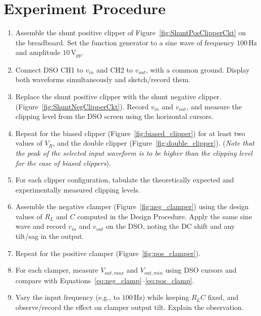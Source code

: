 \section{Experiment Procedure}

\begin{enumerate}[label=\arabic*.]
	\item Assemble the shunt positive clipper of Figure~\ref{fig:ShuntPosClipperCkt} on the breadboard. Set the function generator to a sine wave of frequency $100\,\text{Hz}$ and amplitude $10\,\text{V}_{pp}$. 
	\item Connect DSO CH1 to $v_{in}$ and CH2 to $v_{out}$, with a common ground. Display both waveforms simultaneously and sketch/record them.
	\item Replace the shunt positive clipper with the shunt negative clipper. (Figure~\ref{fig:ShuntNegClipperCkt}). Record $v_{in}$ and $v_{out}$, and measure the clipping level from the DSO screen using the horizontal cursors.
	\item Repeat for the biased clipper (Figure~\ref{fig:biased_clipper}) for at least two values of $V_R$, and the double clipper (Figure~\ref{fig:double_clipper}). (\emph{Note that the peak of the selected input waveform is to be higher than the clipping level for the case of biased clippers}).
	\item For each clipper configuration, tabulate the theoretically expected and experimentally measured clipping levels.
	\item Assemble the negative clamper (Figure~\ref{fig:neg_clamper}) using the design values of $R_L$ and $C$ computed in the Design Procedure. Apply the same sine wave and record $v_{in}$ and $v_{out}$ on the DSO, noting the DC shift and any tilt/sag in the output.
	\item Repeat for the positive clamper (Figure~\ref{fig:pos_clamper}).
	\item For each clamper, measure $V_{out,max}$ and $V_{out,min}$ using DSO cursors and compare with Equations~\eqref{eq:neg_clamp}--\eqref{eq:pos_clamp}.
	\item Vary the input frequency (e.g., to $100\,\text{Hz}$) while keeping $R_L C$ fixed, and observe/record the effect on clamper output tilt. Explain the observation.
\end{enumerate}

